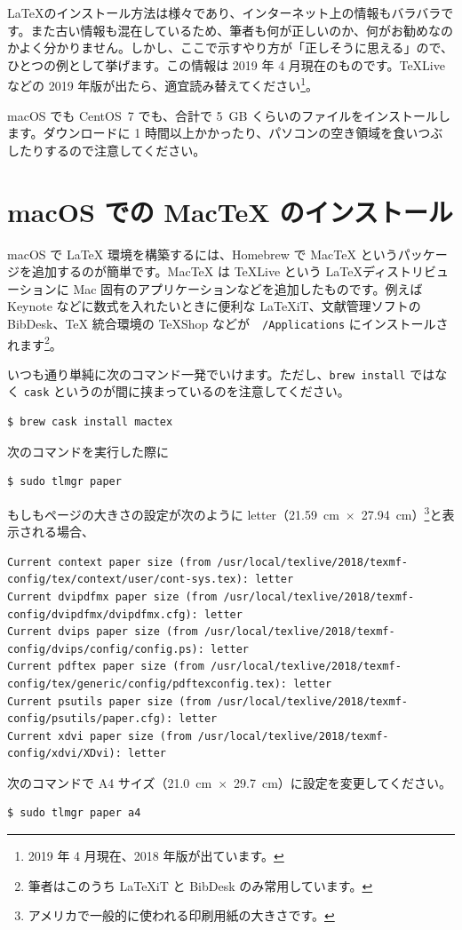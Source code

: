 \LaTeX のインストール方法は様々であり、インターネット上の情報もバラバラです。また古い情報も混在しているため、筆者も何が正しいのか、何がお勧めなのかよく分かりません。しかし、ここで示すやり方が「正しそうに思える」ので、ひとつの例として挙げます。この情報は 2019 年 4 月現在のものです。TeXLive などの 2019 年版が出たら、適宜読み替えてください\footnote{2019 年 4 月現在、2018 年版が出ています。}。

macOS でも CentOS~7 でも、合計で 5~GB くらいのファイルをインストールします。ダウンロードに 1 時間以上かかったり、パソコンの空き領域を食いつぶしたりするので注意してください。

\section{macOS での MacTeX のインストール}

macOS で LaTeX 環境を構築するには、Homebrew で MacTeX というパッケージを追加するのが簡単です。MacTeX は TeXLive という \LaTeX ディストリビューションに Mac 固有のアプリケーションなどを追加したものです。例えば Keynote などに数式を入れたいときに便利な LaTeXiT、文献管理ソフトの BibDesk、TeX 統合環境の TeXShop などが　\texttt{/Applications} にインストールされます\footnote{筆者はこのうち LaTeXiT と BibDesk のみ常用しています。}。

いつも通り単純に次のコマンド一発でいけます。ただし、\texttt{brew install} ではなく \texttt{cask} というのが間に挟まっているのを注意してください。
\begin{lstlisting}[language=bash]
$ brew cask install mactex
\end{lstlisting}

次のコマンドを実行した際に
\begin{lstlisting}[language=bash]
$ sudo tlmgr paper
\end{lstlisting}
もしもページの大きさの設定が次のように letter（21.59~cm~$\times$~27.94~cm）\footnote{アメリカで一般的に使われる印刷用紙の大きさです。}と表示される場合、
\begin{lstlisting}
Current context paper size (from /usr/local/texlive/2018/texmf-config/tex/context/user/cont-sys.tex): letter
Current dvipdfmx paper size (from /usr/local/texlive/2018/texmf-config/dvipdfmx/dvipdfmx.cfg): letter
Current dvips paper size (from /usr/local/texlive/2018/texmf-config/dvips/config/config.ps): letter
Current pdftex paper size (from /usr/local/texlive/2018/texmf-config/tex/generic/config/pdftexconfig.tex): letter
Current psutils paper size (from /usr/local/texlive/2018/texmf-config/psutils/paper.cfg): letter
Current xdvi paper size (from /usr/local/texlive/2018/texmf-config/xdvi/XDvi): letter
\end{lstlisting}
次のコマンドで A4 サイズ（21.0~cm~$\times$~29.7~cm）に設定を変更してください。
\begin{lstlisting}[language=bash]
$ sudo tlmgr paper a4
\end{lstlisting}

